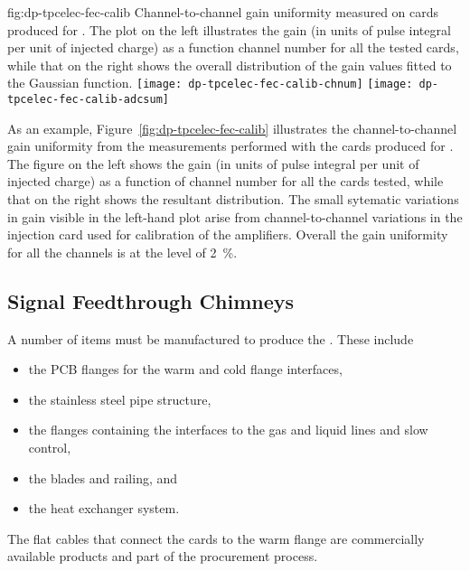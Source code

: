 \begin{dunefigure}{fig:dp-tpcelec-fec-calib}
{Channel-to-channel gain uniformity measured on  cards produced for . The plot on the left illustrates the gain (in units of pulse integral per unit of injected charge) as a function channel number for all the tested cards, while that on the right shows the overall distribution of the gain values fitted to the Gaussian function.}
\texttt{[image: dp-tpcelec-fec-calib-chnum]}
\texttt{[image: dp-tpcelec-fec-calib-adcsum]}
\end{dunefigure}

As an example, Figure~\ref{fig:dp-tpcelec-fec-calib} illustrates the channel-to-channel gain uniformity from the measurements performed with the  cards produced for . The figure on the %
left shows the gain (in units of pulse integral per unit of injected charge) as a function of channel number for all the cards tested, while that on the right shows the resultant distribution. The small sytematic variations in gain visible in the left-hand plot  arise from channel-to-channel variations in the injection card used for calibration of the  amplifiers. Overall the gain uniformity for all the channels is at the level of \SI{2}{\percent}.


\subsection{Signal Feedthrough Chimneys}
\label{ssec:dp-tpcelec-prod-sft}

A number of items must be manufactured to produce the . These include 
\begin{itemize}
\item the PCB flanges for the warm and cold \fdth flange interfaces, 
\item the stainless steel pipe structure, 
\item the flanges containing the interfaces to the gas and liquid lines and slow control, 
\item the blades and railing, and 
\item the heat exchanger system. 
\end{itemize}
The flat cables that connect the  cards to the warm flange are commercially available products and part of the  procurement process. 

